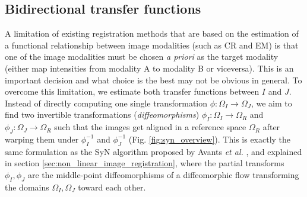 \subsection{Bidirectional transfer functions}
A limitation of existing registration methods that are based on the estimation of a functional relationship between image modalities (such as CR and EM\cite{Roche1998, Roche2000, Arce-santana2014}) is that one of the image modalities must be chosen \emph{a priori} as the target modality (either map intensities from modality A to modality B or viceversa). This is an important decision and what choice is the best may not be obvious in general. To overcome this limitation, we estimate both transfer functions between $I$ and $J$. Instead of directly computing one single transformation $\phi:\Omega_{I} \rightarrow \Omega_{J}$, we aim to find two invertible transformations (\emph{diffeomorphisms}) $\phi_{I}:\Omega_{I}\rightarrow \Omega_{R}$ and $\phi_{J}:\Omega_{J}\rightarrow \Omega_{R}$ such that the images get aligned in a reference space $\Omega_{R}$ after warping them under $\phi_{I}^{-1}$ and $\phi_{J}^{-1}$ (Fig. \ref{fig:syn_overview}). This is exactly the same formulation as the SyN algorithm proposed by Avants {\it et al.} \cite{Avants2011}, and explained in section \ref{sec:non_linear_image_registration}, where the partial transforms $\phi_{I}, \phi_{J}$ are the middle-point diffeomorphisms of a diffeomorphic flow transforming the domains $\Omega_{I}, \Omega_{J}$ toward each other.\\

